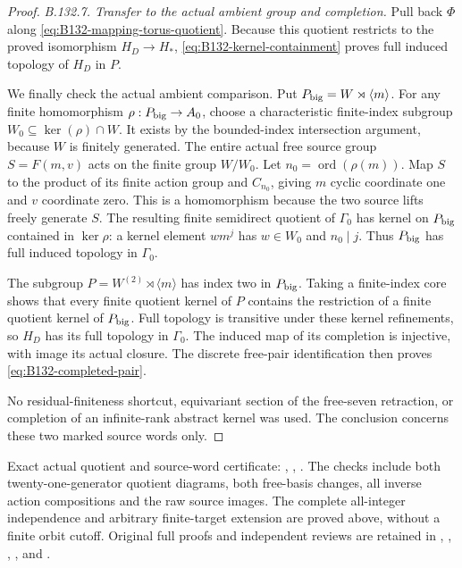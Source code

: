 \begin{proof}
\emph{B.132.7. Transfer to the actual ambient group and completion.}
Pull back \(\Phi\) along \eqref{eq:B132-mapping-torus-quotient}.
Because this quotient restricts to the proved isomorphism
\(H_D\to H_*\), \eqref{eq:B132-kernel-containment} proves
full induced topology of \(H_D\) in \(P\).

We finally check the actual ambient comparison. Put
\(P_{\rm big}=W\rtimes\langle m\rangle\).
For any finite homomorphism \(\rho:P_{\rm big}\to A_0\),
choose a characteristic finite-index subgroup
\(W_0\subseteq\ker(\rho)\cap W\). It exists by the bounded-index
intersection argument, because \(W\) is finitely generated.
The entire actual free source group \(S=F(m,v)\) acts on the
finite group \(W/W_0\). Let \(n_0=\operatorname{ord}(\rho(m))\).
Map \(S\) to the product of its finite action group and
\(C_{n_0}\), giving \(m\) cyclic coordinate one and \(v\)
coordinate zero. This is a homomorphism because the two source
lifts freely generate \(S\).
The resulting finite semidirect quotient of \(\Gamma_0\) has
kernel on \(P_{\rm big}\) contained in \(\ker\rho\): a kernel
element \(wm^j\) has \(w\in W_0\) and \(n_0\mid j\).
Thus \(P_{\rm big}\) has full induced topology in \(\Gamma_0\).

The subgroup \(P=W^{(2)}\rtimes\langle m\rangle\) has index
two in \(P_{\rm big}\). Taking a finite-index core shows that
every finite quotient kernel of \(P\) contains the restriction
of a finite quotient kernel of \(P_{\rm big}\).
Full topology is transitive under these kernel refinements, so
\(H_D\) has its full topology in \(\Gamma_0\). The induced
map of its completion is injective, with image its actual closure.
The discrete free-pair identification then proves
\eqref{eq:B132-completed-pair}.

No residual-finiteness shortcut, equivariant section of the
free-seven retraction, or completion of an infinite-rank abstract
kernel was used. The conclusion concerns these two marked source
words only.
\end{proof}

\begingroup\raggedright\footnotesize
Exact actual quotient and source-word certificate:
,
,
.
The checks include both twenty-one-generator quotient diagrams,
both free-basis changes, all inverse action compositions and the raw
source images. The complete all-integer independence and arbitrary
finite-target extension are proved above, without a finite orbit cutoff.
Original full proofs and independent reviews are retained in
,
,
,
,
and .
\par\endgroup
